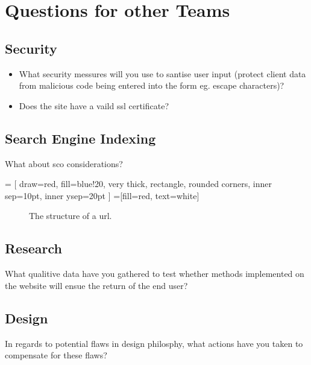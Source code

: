 \documentclass[letterpaper,12pt]{article}
\begin{document}
\section{Questions for other Teams}

\subsection{Security}

\begin{itemize}
  \item
What security messures will you use to santise user input (protect client data from malicious code being entered into the form eg. escape characters)?
  \item
Does the site have a vaild \gls{ssl} certificate?
\end{itemize}

\subsection{Search Engine Indexing}

What about \gls{sco} considerations?

 = [
    draw=red,
    fill=blue!20,
    very thick,
    rectangle,
    rounded corners,
    inner sep=10pt,
    inner ysep=20pt
]
 =[fill=red, text=white]

\begin{figure}
  \centering
{}
  \caption{The structure of a \acrfull{url}.}
\end{figure}

\subsection{Research}

What qualitive data have you gathered to test whether methods implemented on the website will ensue the return of the end user?

\subsection {Design}

In regards to potential flaws in design philosphy, what actions have you taken to compensate for these flaws?

\appendix
\printindex
{}
\printglossaries

\end{document}

